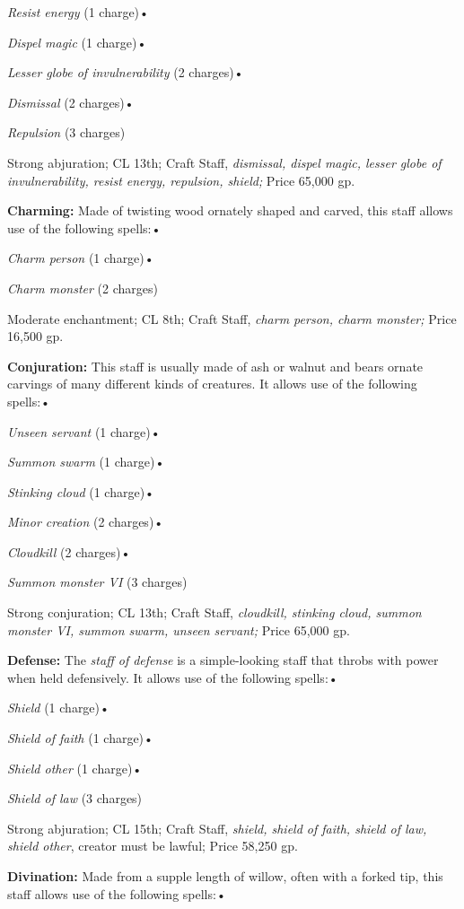 \textit{Resist energy }(1 charge)•

\textit{Dispel magic }(1 charge)•

\textit{Lesser globe of invulnerability }(2 charges)•

\textit{Dismissal }(2 charges)•

\textit{Repulsion }(3 charges)

Strong abjuration; CL 13th; Craft Staff, \textit{dismissal, dispel magic, lesser 
globe of invulnerability, resist energy, repulsion, shield; }Price 65,000 gp.

\textbf{Charming:} Made of twisting wood ornately shaped and carved, this staff 
allows use of the following spells:•

\textit{Charm person }(1 charge)•

\textit{Charm monster }(2 charges)

Moderate enchantment; CL 8th; Craft Staff, \textit{charm person, charm monster; 
}Price 16,500 gp.

\textbf{Conjuration:} This staff is usually made of ash or walnut and bears ornate 
carvings of many different kinds of creatures. It allows use of the following spells:•

\textit{Unseen servant }(1 charge)•

\textit{Summon swarm }(1 charge)•

\textit{Stinking cloud }(1 charge)•

\textit{Minor creation }(2 charges)•

\textit{Cloudkill }(2 charges)•

\textit{Summon monster VI }(3 charges)

Strong conjuration; CL 13th; Craft Staff, \textit{cloudkill, stinking cloud, summon 
monster VI, summon swarm, unseen servant; }Price 65,000 gp.

\textbf{Defense: }The \textit{staff of defense }is a simple-looking staff that 
throbs with power when held defensively. It allows use of the following spells:•

\textit{Shield }(1 charge)•

\textit{Shield of faith }(1 charge)•

\textit{Shield other }(1 charge)•

\textit{Shield of law }(3 charges)

Strong abjuration; CL 15th; Craft Staff, \textit{shield, shield of faith, shield 
of law, shield other}, creator must be lawful; Price 58,250 gp.

\textbf{Divination:} Made from a supple length of willow, often with a forked tip, 
this staff allows use of the following spells:•

